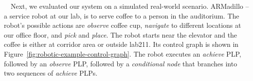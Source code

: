 \documentclass[letterpaper]{article}
\begin{document}
\ \
Next, we evaluated our system on a simulated real-world scenario.
ARMadillo -- a service robot at our lab, is to serve coffee to a person in the auditorium.
The robot's possible actions are {\em observe} coffee cup, {\em navigate} to different locations at our office floor, and {\em pick} and {\em place}. %
%
%
%
%
%
%
The robot starts near the elevator and the coffee is either at corridor area or outside lab211. Its control graph is shown in Figure~\ref{fig:robotic-example-control-graph}.
The robot executes an {\em achieve} PLP, followed by an {\em observe} PLP, followed by a {\em conditional node} that branches into  two sequences of {\em achieve} PLPs.



\end{document}
